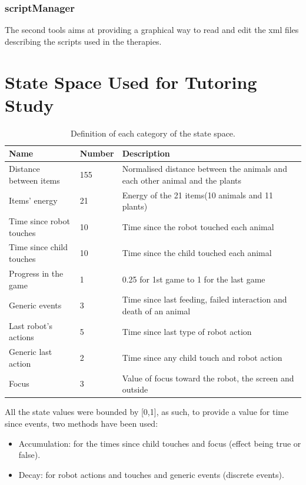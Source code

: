 \subsection{scriptManager}

The second tools aims at providing a graphical way to read and edit the xml files describing the scripts used in the therapies.

\cleartooddpage
\chapter{State Space Used for Tutoring Study} \label{app:state}
\begin{table}[ht]
	\centering
	\caption{Definition of each category of the state space.}
	\label{tab:tutoring_policies}
	\begin{tabularx}{\textwidth}{@{}llX@{}}\toprule
		Name & Number & Description \\
		\midrule
		Distance between items & 155 & Normalised distance between the animals and each other animal and the plants\\
		Items' energy & 21 & Energy of the 21 items(10 animals and 11 plants)\\
		Time since robot touches & 10 & Time since the robot touched each animal\\ %
		Time since child touches & 10 & Time since the child touched each animal\\ %
		Progress in the game & 1 & 0.25 for 1st game to 1 for the last game\\ 
		Generic events & 3 & Time since last feeding, failed interaction and death of an animal\\ %
		Last robot's actions & 5 & Time since last type of robot action\\ %
		Generic last action & 2 & Time since any child touch and robot action\\ %
		Focus & 3 & Value of focus toward the robot, the screen and outside\\ %
		\bottomrule
	\end{tabularx}
\end{table}

All the state values were bounded by [0,1], as such, to provide a value for time since events, two methods have been used:
\begin{itemize}
	\item Accumulation: for the times since child touches and focus (effect being true or false).
	\item Decay: for robot actions and touches and generic events (discrete events).
\end{itemize}

